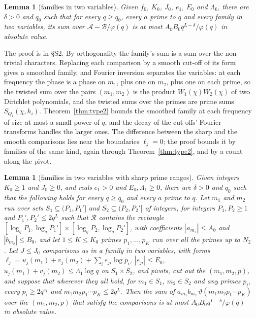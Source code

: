 \documentclass[11pt]{article}
\newtheorem{lemma}[theorem]{Lemma}
\theoremstyle{definition}
\begin{document}
\begin{lemma}[families in two variables]\label{lem:family-two}
Given $f_0$, $K_0$, $J_0$, $e_1$, $E_0$ and $\Lambda_0$, there are $\delta > 0$ and $q_0$ such that for every $q \ge
q_0$, every $a$ prime to $q$ and every family in two variables, its sum over $\mathcal A - \mathcal B/\varphi(q)$ is at
most $A_0 B_0 q^{L - \delta}/\varphi(q)$ in absolute value.
\end{lemma}

The proof is in \S S2. By orthogonality the family's sum is a sum over the non-trivial characters. Replacing each
comparison by a smooth cut-off of its form gives a smoothed family, and Fourier inversion separates the variables: at
each frequency the phase is a phase on $m_1$, plus one on $m_2$, plus one on each prime, so the twisted sum over the
pairs $(m_1, m_2)$ is the product $W_1(\chi) W_2(\chi)$ of two Dirichlet polynomials, and the twisted sums over the
primes are prime sums $S_{Q_i}(\chi, h_i)$. Theorem~\ref{thm:type2} bounds the smoothed family at each frequency of size
at most a small power of $q$, and the decay of the cut-offs' Fourier transforms handles the larger ones. The difference
between the sharp and the smooth comparisons lies near the boundaries $\ell_j = 0$; the proof bounds it by families of
the same kind, again through Theorem~\ref{thm:type2}, and by a count along the pivot.

\begin{lemma}[families in two variables with sharp prime ranges]\label{lem:family-sharp-two}
Given integers $K_0 \ge 1$ and $J_0 \ge 0$, and reals $e_1 > 0$ and $E_0, \Lambda_1 \ge 0$, there are $\delta > 0$ and
$q_0$ such that the following holds for every $q \ge q_0$ and every $a$ prime to $q$. Let $m_1$ and $m_2$ run over sets
$S_1 \subseteq (P_1, P_1']$ and $S_2 \subseteq (P_2, P_2']$ of integers, for integers $P_1, P_2 \ge 1$ and $P_1', P_2'
\le 2q^L$ such that $\mathcal R$ contains the rectangle $[\log_q P_1, \log_q P_1'] \times [\log_q P_2, \log_q P_2']$,
with coefficients $|a_{m_1}| \le A_0$ and $|b_{m_2}| \le B_0$, and let $1 \le K \le K_0$ primes $p_1, \dots, p_K$ run
over all the primes up to $N_2$. Let $J \le J_0$ comparisons as in a family in two variables, with forms $\ell_j =
u_j(m_1) + v_j(m_2) + \sum_i e_{ji} \log p_i$, $|e_{ji}| \le E_0$, $u_j(m_1) + v_j(m_2) \le \Lambda_1
\log q$ on $S_1 \times S_2$, and pivots, cut out the $(m_1, m_2, p)$, and suppose that wherever they all hold, for $m_1
\in S_1$, $m_2 \in S_2$ and any primes $p_i$, every $p_i \ge 2q^{e_1}$ and $m_1 m_2 p_1 \cdots p_K \le 2q^L$. Then the
sum of $a_{m_1} b_{m_2}\, \vartheta(m_1 m_2 p_1 \cdots p_K)$ over the $(m_1, m_2, p)$ that satisfy the comparisons is at
most $A_0 B_0 q^{L - \delta}/\varphi(q)$ in absolute value.
\end{lemma}
\end{document}
